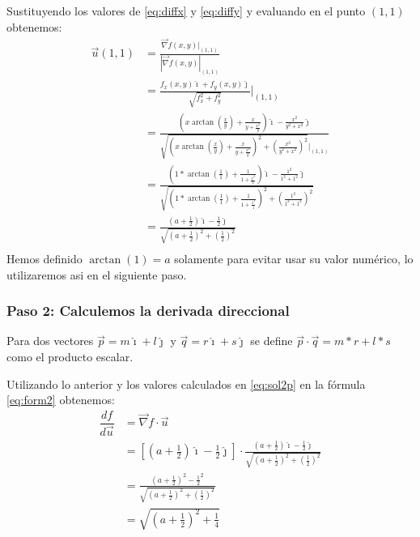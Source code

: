         Sustituyendo los valores de \eqref{eq:diffx} y \eqref{eq:diffy} y evaluando en el punto $(1, 1)$ obtenemos:
        \begin{equation}
            \begin{split}
                \vec{u}(1,1) & = \frac{\vec{\nabla} f(x, y)|_{(1,1)}}{|\vec{\nabla} f(x, y)|_{(1,1)}} \\
                & = \frac{f_x(x, y)\hat{\imath} + f_y(x, y)\hat{\jmath}}{\sqrt{f_x^2 + f_y^2}}|_{(1,1)} \\
                & = \frac{\left( x\arctan(\frac{x}{y}) + \frac{x}{y + \frac{x^2}{y}}\right) \hat{\imath} - \frac{x^2}{y^2 + x^2}\hat{\jmath}}
                {\sqrt{\left( x\arctan(\frac{x}{y}) + \frac{x}{y + \frac{x^2}{y}}\right)^2 + \left(\frac{x^2}{y^2 + x^2}\right)^2}|_{(1,1)}} \\
                & = \frac{\left( 1*\arctan(\frac{1}{1}) + \frac{1}{1 + \frac{1^2}{1}}\right) \hat{\imath} - \frac{1^2}{1^2 + 1^2}\hat{\jmath}}
                {\sqrt{\left( 1*\arctan(\frac{1}{1}) + \frac{1}{1 + \frac{1^2}{1}}\right)^2 + \left(\frac{1^2}{1^2 + 1^2}\right)^2}} \\
                & = \frac{\left( a + \frac{1}{2}\right) \hat{\imath} - \frac{1}{2}\hat{\jmath}}
                {\sqrt{\left( a + \frac{1}{2}\right)^2 + \left(\frac{1}{2}\right)^2}} \\
            \end{split}
            \label{eq:sol2p}
        \end{equation}
        Hemos definido $\arctan(1) = a$ solamente para evitar usar su valor numérico, lo utilizaremos asi en el siguiente paso.

    \subsubsection*{Paso 2: Calculemos la derivada direccional}
        Para dos vectores $\vec{p} = m \hat{\imath} + l \hat{\jmath} $ y $\vec{q} = r \hat{\imath} + s \hat{\jmath} $ se define
        $ \vec{p} \cdot \vec{q} = m*r + l*s $ como el producto escalar.

        Utilizando lo anterior y los valores calculados en \eqref{eq:sol2p} en la fórmula \eqref{eq:form2} obtenemos:
        \begin{equation}
            \begin{split}
                \dfrac{d f}{d \vec{u}} & = \vec{\nabla}f \cdot \vec{u} \\
                & = \left[\left( a + \frac{1}{2}\right) \hat{\imath} - \frac{1}{2}\hat{\jmath} \right]\cdot \frac{\left( a + \frac{1}{2}\right)
                 \hat{\imath} - \frac{1}{2}\hat{\jmath}} {\sqrt{\left( a + \frac{1}{2}\right)^2 + \left(\frac{1}{2}\right)^2}} \\
                & = \frac{\left( a + \frac{1}{2}\right)^2 - \frac{1}{2}^2}
                 {\sqrt{\left( a + \frac{1}{2}\right)^2 + \left(\frac{1}{2}\right)^2}} \\
                 & = \sqrt{\left( a + \frac{1}{2}\right)^2 + \frac{1}{4}} \\
            \end{split}
        \end{equation}
